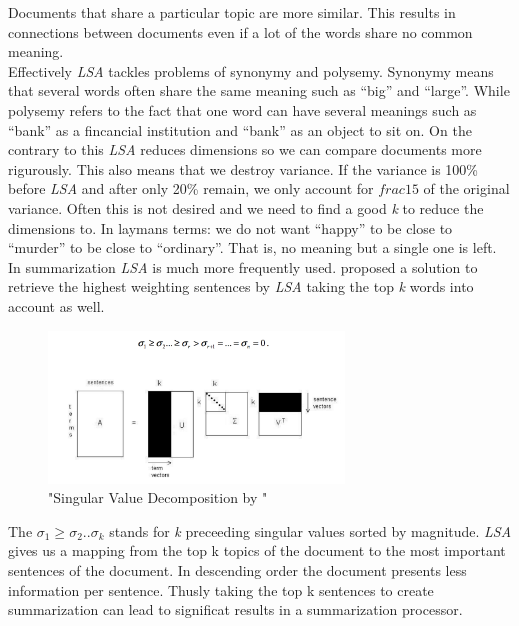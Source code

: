       Documents that share a particular topic are more similar. This results in connections between documents even if a lot of the words share no common meaning.\\
      Effectively \emph{LSA} tackles problems of synonymy and polysemy. Synonymy means that several words often share the same meaning such as ``big'' and ``large''. While polysemy refers to the fact that one word can have several meanings such as ``bank'' as a fincancial institution and ``bank'' as an object to sit on.
      On the contrary to this \emph{LSA} reduces dimensions so we can compare documents more rigurously. This also means that we destroy variance. If the variance is 100\% before \emph{LSA} and after only 20\% remain, we only account for $frac{1}{5}$ of the original variance. Often this is not desired and we need to find a good \emph{k} to reduce the dimensions to. In laymans terms: we do not want ``happy'' to be close to ``murder'' to be close to ``ordinary''. That is, no meaning but a single one is left.
      In summarization \emph{LSA} is much more frequently used. \cite{SumLSASteinberger2004} proposed a solution to retrieve the highest weighting sentences by \emph{LSA} taking the top \emph{k} words into account as well.

      \begin{figure}[h!]
        \centering
          \includegraphics[width=0.7\textwidth]{svd_lsa.png}
          \caption{"Singular Value Decomposition by \cite{SumLSASteinberger2004}"}
          \label{svd_lsa}
      \end{figure}

      The $\sigma_1 \geq \sigma_2..\sigma_k$ stands for \emph{k} preceeding singular values sorted by magnitude. \emph{LSA} gives us a mapping from the top k topics of the document to the most important sentences of the document. In descending order the document presents less information per sentence. Thusly taking the top k sentences to create summarization can lead to significat results in a summarization processor. \cite{SumLSASteinberger2004}

